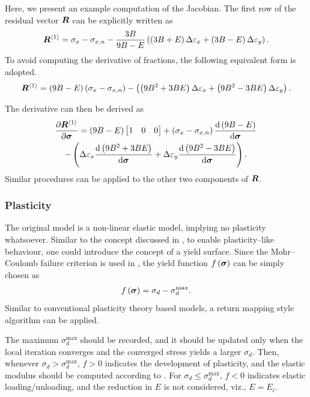 Here, we present an example computation of the Jacobian.
The first row of the residual vector $\bm{R}$ can be explicitly written as
\begin{gather}
\bm{R}^{\left\langle1\right\rangle}=\sigma_x-\sigma_{x,n}-\dfrac{3B}{9B-E}\left(\left(3B+E\right)\Delta\varepsilon_x+\left(3B-E\right)\Delta\varepsilon_y\right).
\end{gather}
To avoid computing the derivative of fractions, the following equivalent form is adopted.
\begin{gather}
\bm{R}^{\left\langle1\right\rangle}=\left(9B-E\right)\left(\sigma_x-\sigma_{x,n}\right)-\left(\left(9B^2+3BE\right)\Delta\varepsilon_x+\left(9B^2-3BE\right)\Delta\varepsilon_y\right).
\end{gather}

The derivative can then be derived as
\begin{multline}
\dfrac{\partial{\bm{R}^{\left\langle1\right\rangle}}}{\partial{\bm{\sigma}}}=\left(9B-E\right)\begin{bmatrix}
1&0&0
\end{bmatrix}+\left(\sigma_x-\sigma_{x,n}\right)\dfrac{\mathrm{d}\left(9B-E\right)}{\mathrm{d}\bm{\sigma}}\\-\left(\Delta\varepsilon_x\dfrac{\mathrm{d}\left(9B^2+3BE\right)}{\mathrm{d}\bm{\sigma}}+\Delta\varepsilon_y\dfrac{\mathrm{d}\left(9B^2-3BE\right)}{\mathrm{d}\bm{\sigma}}\right).
\end{multline}
Similar procedures can be applied to the other two components of $\bm{R}$.
\subsubsection{Plasticity}
The original model is a non-linear elastic model, implying no plasticity whatsoever.
Similar to the concept discussed in \cite{Katona2015}, to enable plasticity--like behaviour, one could introduce the concept of a yield surface.
Since the Mohr--Coulomb failure criterion is used in , the yield function $f\left(\bm{\sigma}\right)$ can be simply chosen as
\begin{gather}
f\left(\bm{\sigma}\right)=\sigma_d-\sigma_d^\text{max}.
\end{gather}
Similar to conventional plasticity theory based models, a return mapping style algorithm can be applied.

The maximum $\sigma_d^\text{max}$ should be recorded, and it should be updated only when the local iteration converges and the converged stress yields a larger $\sigma_d$.
Then, whenever $\sigma_d>\sigma_d^\text{max}$, $f>0$ indicates the development of plasticity, and the elastic modulus should be computed according to .
For $\sigma_d\leqslant\sigma_d^\text{max}$, $f<0$ indicates elastic loading/unloading, and the reduction in $E$ is not considered, viz., $E=E_i$.

